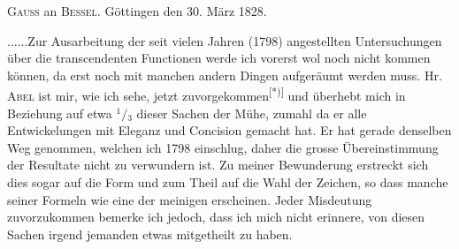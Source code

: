 \begingroup
{}
\begin{center}\textsc{Gauss} an \textsc{Bessel}. Göttingen den 30. März 1828.\end{center}
\noindent .\enspace .\enspace .\enspace .\enspace .\enspace .\quad Zur Ausarbeitung der seit vielen Jahren (1798) angestellten Untersuchungen über die transcendenten Functionen werde ich vorerst wol noch nicht kommen können, da erst noch mit manchen andern Dingen aufgeräumt werden muss. Hr. \textsc{Abel} ist mir, wie ich sehe, jetzt zuvorgekommen\textsuperscript{[*)]} und überhebt mich in Beziehung auf etwa ${}^1\! /\! {}_3$ dieser Sachen der Mühe, zumahl da er alle Entwickelungen mit Eleganz und Concision gemacht hat. Er hat gerade denselben Weg genommen, welchen ich 1798 einschlug, daher die grosse Übereinstimmung der Resultate nicht zu verwundern ist. Zu meiner Bewunderung erstreckt sich dies sogar auf die Form und zum Theil auf die Wahl der Zeichen, so dass manche seiner Formeln wie eine  der meinigen erscheinen. Jeder Misdeutung zuvorzukommen bemerke ich jedoch, dass ich mich nicht erinnere, von diesen Sachen irgend jemanden etwas mitgetheilt zu haben.

